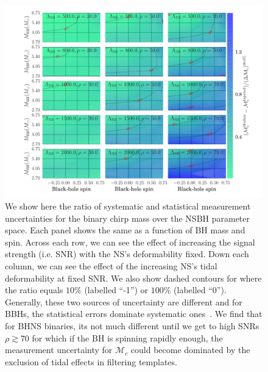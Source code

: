 \documentclass[aps,prd,amsmath,floats,floatfix, twocolumn,
superscriptaddress,nofootinbib,showpacs]{revtex4-1}
\newcommand{\mchirp}{\mathcal{M}_c}
\begin{document}
\begin{figure}
\centering 
\includegraphics[width=1.6\columnwidth]{plots/TNMchirpBiasesOverCIWidths_CI90_0_Lambda_SNR30_70_linear}
\caption{We show here the ratio of systematic and statistical
measurement uncertainties for the binary chirp mass over the NSBH parameter 
space. Each panel shows the same as a function of BH mass and spin. Across
each row, we can see the effect of increasing the signal strength (i.e. SNR)
with the NS's deformability fixed. Down each column, we can see 
the effect of the increasing NS's tidal deformability at fixed SNR. We also
show dashed contours for where the ratio equals $10\%$ (labelled ``-1'')
or $100\%$ (labelled ``0'').
% 
Generally, these two sources of uncertainty are different and for BBHs, the
statistical errors dominate systematic ones~\cite{Kumar:2016dhh}. We find
that for BHNS binaries, its not much different until we get to high SNRs
$\rho\gtrsim 70$ for which if the BH is spinning rapidly enough, the 
measurement uncertainty for $\mchirp$ could become dominated by the exclusion
of tidal effects in filtering templates.
}
\label{fig:TN_chirpMassBias_vs_Lambda_SNR}
\end{figure}
%
\end{document}
